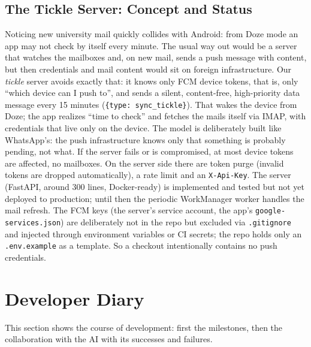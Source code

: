 \documentclass{msereport}
\begin{document}
\msegap

\subsection{The Tickle Server: Concept and Status}

Noticing new university mail quickly collides with Android: from Doze mode an
app may not check by itself every minute. The usual way out would be a server
that watches the mailboxes and, on new mail, sends a push message with content,
but then credentials and mail content would sit on foreign infrastructure. Our
\emph{tickle} server avoids exactly that: it knows only FCM device tokens, that
is, only ``which device can I push to'', and sends a silent, content-free,
high-priority data message every 15 minutes (\texttt{\{type: sync\_tickle\}}).
That wakes the device from Doze; the app realizes ``time to check'' and fetches
the mails itself via IMAP, with credentials that live only on the device. The
model is deliberately built like WhatsApp's: the push infrastructure knows only
that something is probably pending, not what. If the server fails or is
compromised, at most device tokens are affected, no mailboxes. On the server
side there are token purge (invalid tokens are dropped automatically), a rate
limit and an \texttt{X-Api-Key}. The server (FastAPI, around 300 lines,
Docker-ready) is implemented and tested but not yet deployed to production;
until then the periodic WorkManager worker handles the mail refresh. The FCM
keys (the server's service account, the app's \texttt{google-services.json}) are
deliberately not in the repo but excluded via \texttt{.gitignore} and injected
through environment variables or CI secrets; the repo holds only an
\texttt{.env.example} as a template. So a checkout intentionally contains no push
credentials.

\msegap

\section{Developer Diary}

This section shows the course of development: first the milestones, then the
collaboration with the AI with its successes and failures.
\par\vspace{6pt}
\end{document}
